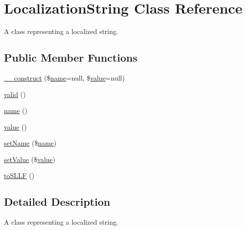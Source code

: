 \hypertarget{class_simple_lion_1_1_localization_string}{\section{Localization\-String Class Reference}
\label{class_simple_lion_1_1_localization_string}
}


A class representing a localized string.  


\subsection*{Public Member Functions}
\begin{DoxyCompactItemize}
\item 
\hyperlink{class_simple_lion_1_1_localization_string_a0a78b62dd316bf5e63a3f5a5f43092b3}{\-\_\-\-\_\-construct} (\$\hyperlink{class_simple_lion_1_1_localization_string_a4b516aaa5fa38da4fed24ab6001627e2}{name}=null, \$\hyperlink{class_simple_lion_1_1_localization_string_aefbfa229f1c9e1fc967bff724a010f9e}{value}=null)
\item 
\hyperlink{class_simple_lion_1_1_localization_string_abb9f0d6adf1eb9b3b55712056861a247}{valid} ()
\item 
\hyperlink{class_simple_lion_1_1_localization_string_a4b516aaa5fa38da4fed24ab6001627e2}{name} ()
\item 
\hyperlink{class_simple_lion_1_1_localization_string_aefbfa229f1c9e1fc967bff724a010f9e}{value} ()
\item 
\hyperlink{class_simple_lion_1_1_localization_string_a2fe666694997d047711d7653eca2f132}{set\-Name} (\$\hyperlink{class_simple_lion_1_1_localization_string_a4b516aaa5fa38da4fed24ab6001627e2}{name})
\item 
\hyperlink{class_simple_lion_1_1_localization_string_a7494441b6ed08a391704971873f31432}{set\-Value} (\$\hyperlink{class_simple_lion_1_1_localization_string_aefbfa229f1c9e1fc967bff724a010f9e}{value})
\item 
\hyperlink{class_simple_lion_1_1_localization_string_a129b22867863a1b34ffd83448a8546bd}{to\-S\-L\-L\-F} ()
\end{DoxyCompactItemize}


\subsection{Detailed Description}
A class representing a localized string. 


